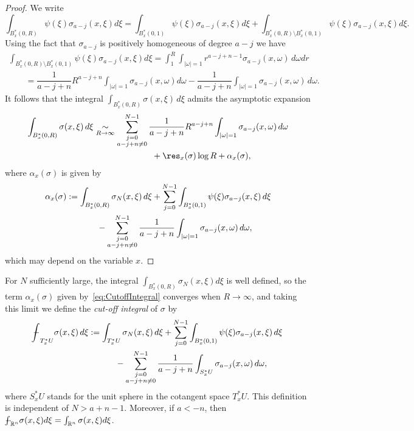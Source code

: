 \begin{proof}
We write
\[
\int_{B_x^*(0,R)}\psi(\xi)\sigma_{a-j}(x,\xi)d\xi=\int_{B_x^*(0,1)}\psi(\xi)\sigma_{a-j}(x,\xi)d\xi +\int_{B_x^*(0,R)\setminus B_x^*(0,1)}\psi(\xi)\sigma_{a-j}(x,\xi)d\xi.
\]
Using the fact that $\sigma_{a-j}$ is positively homogeneous of degree $a-j$ we have
\begin{gather*}
 \int_{B_x^*(0,R)\setminus B_x^*(0,1)}\psi(\xi)\sigma_{a-j}(x,\xi)d\xi=\int_1^R\int_{\vert\omega\vert=1}r^{a-j+n-1}\sigma_{a-j}(x,\omega)\,d\omega dr \\
\qquad{} =\dfrac{1}{a-j+n}R^{a-j+n} \int_{\vert\omega\vert=1}\sigma_{a-j}(x,\omega)d\omega-\dfrac{1}{a-j+n}\int_{\vert\omega\vert=1}\sigma_{a-j}(x,\omega)\,d\omega.
\end{gather*}
It follows that the integral $\int_{B_x^*(0,R)}\sigma(x,\xi)\,d\xi$ admits the asymptotic expansion
\begin{gather*}
\int_{B_x^*(0,R)}\sigma(x,\xi)\,d\xi\underset{R\to\infty}{\sim}\sum_{\substack{j=0\\a-j+n\not=0}}^{N-1} \frac{1}{a-j+n}R^{a-j+n}\int_{\vert\omega\vert=1}\sigma_{a-j}(x,\omega)\,d\omega \\
\hphantom{\int_{B_x^*(0,R)}\sigma(x,\xi)\,d\xi\underset{R\to\infty}{\sim}}{}
+{\res}_x(\sigma)\log R + \alpha_x(\sigma),
\end{gather*}
where $\alpha_x(\sigma)$ is given by
\begin{gather}
\alpha_x(\sigma) := \int_{B_x^*(0,R)}\sigma_N(x, \xi)\,d\xi+\sum_{j=0}^{N-1} \int_{B_x^*(0,1)} \psi(\xi)\sigma_{a-j}(x,\xi)\,d\xi\nonumber\\
\hphantom{\alpha_x(\sigma) :=}{}
-\sum_{\substack{j=0\\ a-j+n\not=0}}^{N-1} \dfrac{1}{a-j+n}\int_{\vert\omega\vert=1}\sigma_{a-j}(x,\omega)\,d\omega,\label{eq:CutoffIntegral}
\end{gather}
which may depend on the variable $x$.
\end{proof}

 For $N$ suf\/f\/iciently large, the integral $\int_{B_x^*(0,R)}\sigma_N(x,\xi)d\xi$ is well def\/ined, so the term $\alpha_x(\sigma)$ given by~\eqref{eq:CutoffIntegral} converges when $R\to\infty$, and taking this limit we def\/ine the \emph{cut-off integral} of $\sigma$ by
\begin{gather*}
{-\hskip -11,5pt\int}_{T^{*}_xU}\sigma(x,\xi)\,d\xi :=\int_{T^{*}_xU}\sigma_N(x,\xi)\,d\xi+\sum_{j=0}^{N-1} \int_{B^{*}_x(0,1)}\psi(\xi)\sigma_{a-j}(x,\xi)\,d\xi\\
\hphantom{{-\hskip -11,5pt\int}_{T^{*}_xU}\sigma(x,\xi)\,d\xi :=}{}  -\sum_{\substack{j=0\\ a-j+n\not=0}}^{N-1}\dfrac{1}{a-j+n}\int_{S^{*}_xU}\sigma_{a-j}(x,\omega)\,d\omega,
\end{gather*}
where $S^{*}_xU$ stands for the unit sphere in the cotangent space $T^{*}_xU$. This def\/inition is independent of $N>a+n-1$. Moreover, if $a<-n$, then ${-\hskip -10pt\int}_{\mathbb{R}^n}\sigma(x,\xi)d\xi=\int_{\mathbb{R}^n}\sigma(x,\xi)d\xi$.

